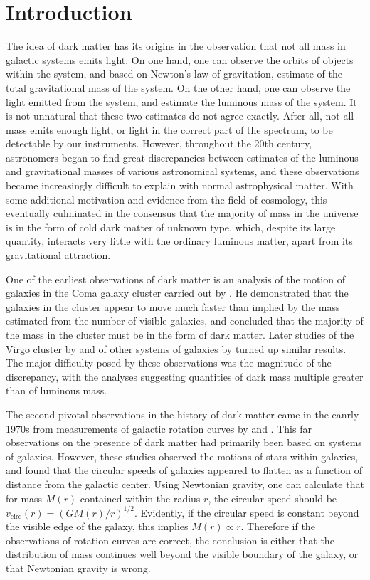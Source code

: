 \documentclass[b5paper, 10pt, twoside]{book}
\begin{document}
\cleardoublepage
\mainmatter

\chapter{Introduction}

The idea of dark matter has its origins in the observation that not all mass in galactic systems emits light. On one hand, one can observe the orbits of objects within the system, and based on Newton's law of gravitation, estimate of the total gravitational mass of the system. On the other hand, one can observe the light emitted from the system, and estimate the luminous mass of the system. It is not unnatural that these two estimates do not agree exactly. After all, not all mass emits enough light, or light in the correct part of the spectrum, to be detectable by our instruments. However, throughout the 20th century, astronomers began to find great discrepancies between estimates of the luminous and gravitational masses of various astronomical systems, and these observations became increasingly difficult to explain with normal astrophysical matter. With some additional motivation and evidence from the field of cosmology, this eventually culminated in the consensus that the majority of mass in the universe is in the form of cold dark matter of unknown type, which, despite its large quantity, interacts very little with the ordinary luminous matter, apart from its gravitational attraction.

One of the earliest observations of dark matter is an analysis of the motion of galaxies in the Coma galaxy cluster carried out by \textcite{Zwicky1933}. He demonstrated that the galaxies in the cluster appear to move much faster than implied by the mass estimated from the number of visible galaxies, and concluded that the majority of the mass in the cluster must be in the form of dark matter. Later studies of the Virgo cluster by \textcite{Smith1936} and of other systems of galaxies by \textcite{Holmberg1937} turned up similar results. The major difficulty posed by these observations was the magnitude of the discrepancy, with the analyses suggesting quantities of dark mass multiple greater than of luminous mass.

The second pivotal observations in the history of dark matter came in the eanrly 1970s from measurements of galactic rotation curves by \textcite{RubinFord1970} and \textcite{Freeman1970}. This far observations on the presence of dark matter had primarily been based on systems of galaxies. However, these studies observed the motions of stars within galaxies, and found that the circular speeds of galaxies appeared to flatten as a function of distance from the galactic center. Using Newtonian gravity, one can calculate that for mass $M(r)$ contained within the radius $r$, the circular speed should be $v_\text{circ}(r)=(GM(r)/r)^{1/2}$. Evidently, if the circular speed is constant beyond the visible edge of the galaxy, this implies $M(r)\propto r$. Therefore if the observations of rotation curves are correct, the conclusion is either that the distribution of mass continues well beyond the visible boundary of the galaxy, or that Newtonian gravity is wrong.
\end{document}
